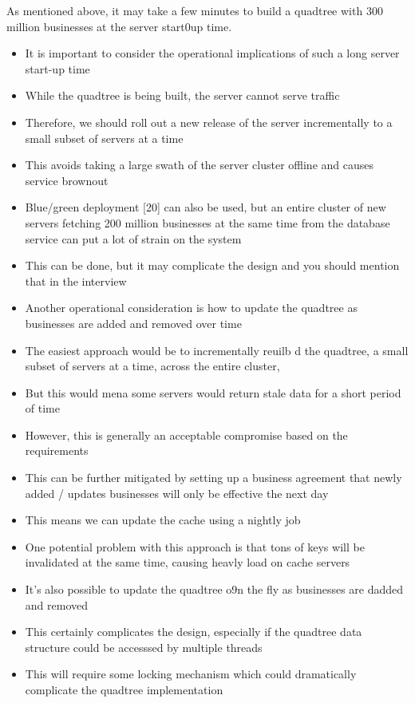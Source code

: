 \documentclass{report}
\theoremstyle{definition}
\begin{document}
As mentioned above, it may take a few minutes to build a quadtree with 300 million businesses at the server start0up time.

\begin{itemize}
\item
It is important to consider the operational implications of such a long server start-up time
\item
While the quadtree is being built, the server cannot serve traffic
\item
Therefore, we should roll out a new release of the server incrementally to a small subset of servers at a time
\item
This avoids taking a large swath of the server cluster offline and causes service brownout
\item
Blue/green deployment [20] can also be used, but an entire cluster of new servers fetching 200 million businesses at the same time from the
database service can put a lot of strain on the system
\item
This can be done, but it may complicate the design and you should mention that in the interview
\item
Another operational consideration is how to update the quadtree as businesses are added and removed over time
\item
The easiest approach would be to incrementally reuilb d the quadtree, a small subset of servers at a time, across the entire cluster,
\item
But this would mena some servers would return stale data for a short period of time
\item
However, this is generally an acceptable compromise based on the requirements
\item
This can be further mitigated by setting up a business agreement that newly added / updates businesses will only be effective the next day
\item
This means we can update the cache using a nightly job
\item
One potential problem with this approach is that tons of keys will be invalidated at the same time, causing heavly load on cache servers
\item
It's also possible to update the quadtree o9n the fly as businesses are dadded and removed
\item
This certainly complicates the design, especially if the quadtree data structure could be accesssed by multiple threads
\item
This will require some locking mechanism which could dramatically complicate the quadtree implementation
\end{itemize}
\end{document}
